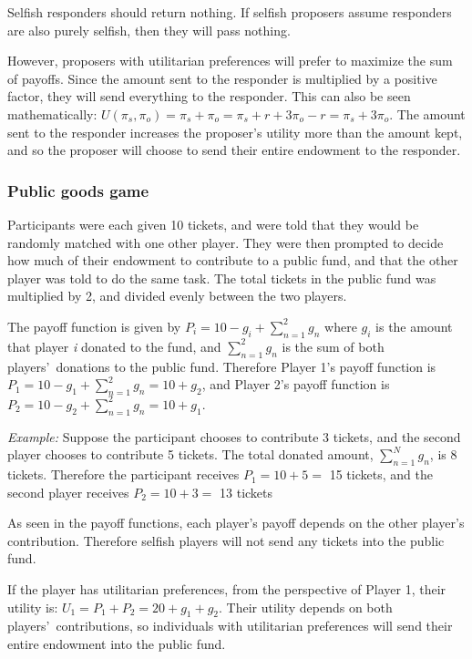 \documentclass[12pt]{article}
\begin{document}
Selfish responders should return nothing. If selfish proposers assume responders are also purely selfish, then they will pass nothing.

However, proposers with utilitarian preferences will prefer to maximize the sum of payoffs. Since the amount sent to the responder is multiplied by a positive factor, they will send everything to the responder. This can also be seen mathematically: \(U(\pi_{s}, \pi_{o}) = \pi_{s} + \pi_{o} = \pi_{s} + r + 3\pi_{o} - r = \pi_{s} + 3\pi_{o} \). The amount sent to the responder increases the proposer\rq s utility more than the amount kept, and so the proposer will choose to send their entire endowment to the responder.
	
\subsubsection{Public goods game}

Participants were each given 10 tickets, and were told that they would be randomly matched with one other player. They were then prompted to decide how much of their endowment to contribute to a public fund, and that the other player was told to do the same task. The total tickets in the public fund was multiplied by 2, and divided evenly between the two players.

The payoff function is given by \( P_{i} = 10 - g_{i} + \sum_{n=1}^{2} g_{n}\) where \(g_{i}\) is the amount that player \textit{i} donated to the fund, and \(\sum_{n=1}^{2}g_{n}\) is the sum of both players\rq \ donations to the public fund. Therefore Player 1\rq s payoff function is \( P_{1} = 10 - g_{1} + \sum_{n=1}^{2} g_{n} = 10 + g_{2}\), and Player 2\rq s payoff function is \( P_{2} = 10 - g_{2} + \sum_{n=1}^{2} g_{n} = 10 + g_{1}\).

\textit{Example:} Suppose the participant chooses to contribute 3 tickets, and the second player chooses to contribute 5 tickets. The total donated amount, \(\sum_{n=1}^{N} g_{n}\), is 8 tickets. Therefore the participant receives \( P_{1} = 10 + 5  = \) 15 tickets, and the second player receives \( P_{2} = 10 + 3 = \) 13 tickets 

As seen in the payoff functions, each player\rq s payoff depends on the other player\rq s contribution. Therefore selfish players will not send any tickets into the public fund.

If the player has utilitarian preferences, from the perspective of Player 1, their utility is: \(U_{1} = P_{1} + P_{2} =  20 + g_{1} + g_{2}\). Their utility depends on both players\rq \ contributions, so individuals with utilitarian preferences will send their entire endowment into the public fund.
\end{document}

